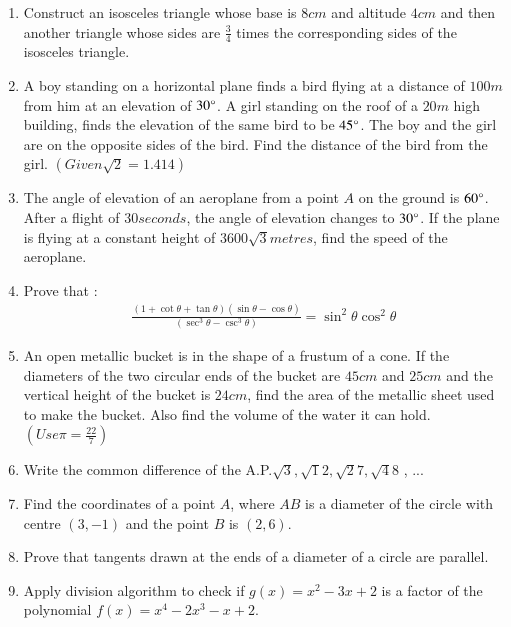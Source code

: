\documentclass[2pt,-letter paper]{article}
\providecommand{\brak}[1]{\ensuremath{\left(#1\right)}}
\begin{document}
\begin{enumerate}
\item Construct an isosceles triangle whose base is $8 cm$ and altitude $4 cm$ and then another triangle whose sides are $\frac{3}{4}$ times the corresponding sides of the isosceles triangle.

\item A boy standing on a horizontal plane finds a bird flying at a distance of $100 m$ from him at an elevation of $30\degree$. A girl standing on the roof of a $20 m$ high building, finds the elevation of the same bird to be $45\degree$. The boy and the girl are on the opposite sides of the bird. Find the distance of the bird from the girl. $(Given {\sqrt 2}= 1.414)$

\item The angle of elevation of an aeroplane from a point $A$ on the ground is $60\degree$. After a flight of $30 seconds$, the angle of elevation changes to $30\degree$. If the plane is flying at a constant height of $3600\sqrt 3 metres$, find the speed of the aeroplane.

\item Prove that :
\begin{align*}
    {\frac{(1+\cot\theta+\tan\theta)(\sin\theta-\cos\theta)}{(\sec^3\theta-\csc^3\theta)}} = \sin^2\theta \cos^2\theta
\end{align*}

\item An open metallic bucket is in the shape of a frustum of a cone. If the diameters of the two circular ends of the bucket are $45 cm$ and $25 cm$ and the vertical height of the bucket is $24 cm$, find the area of the metallic sheet used to make the bucket. Also find the volume of the water it can 
hold. $(Use \pi =\frac{22}{7})$

\item Write the common difference of the A.P.${\sqrt3} , {\sqrt12} , {\sqrt27} , {\sqrt48}$ , ... 

\item Find the coordinates of a point $A$, where $AB$ is a diameter of the circle with centre $\brak{3, -1}$ and the point $B$ is $\brak{2, 6}$.

\item Prove that tangents drawn at the ends of a diameter of a circle are parallel.

\item Apply division algorithm to check if $g\brak{x} = x^2 - 3x + 2$ is a factor of the polynomial $f\brak{x} = x^4 - 2x^3 - x + 2$.


\end{enumerate}
\end{document}
